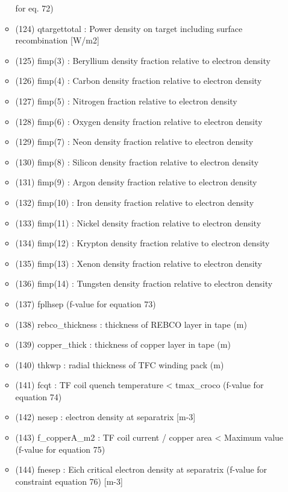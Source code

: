 \documentclass[]{article}
\begin{document}
\begin{itemize}
\begin{itemize}
    for eq. 72)
  \item
    (124) qtargettotal : Power density on target including surface
    recombination {[}W/m2{]}
  \item
    (125) fimp(3) : Beryllium density fraction relative to electron
    density
  \item
    (126) fimp(4) : Carbon density fraction relative to electron density
  \item
    (127) fimp(5) : Nitrogen fraction relative to electron density
  \item
    (128) fimp(6) : Oxygen density fraction relative to electron density
  \item
    (129) fimp(7) : Neon density fraction relative to electron density
  \item
    (130) fimp(8) : Silicon density fraction relative to electron
    density
  \item
    (131) fimp(9) : Argon density fraction relative to electron density
  \item
    (132) fimp(10) : Iron density fraction relative to electron density
  \item
    (133) fimp(11) : Nickel density fraction relative to electron
    density
  \item
    (134) fimp(12) : Krypton density fraction relative to electron
    density
  \item
    (135) fimp(13) : Xenon density fraction relative to electron density
  \item
    (136) fimp(14) : Tungsten density fraction relative to electron
    density
  \item
    (137) fplhsep (f-value for equation 73)
  \item
    (138) rebco\_thickness : thickness of REBCO layer in tape (m)
  \item
    (139) copper\_thick : thickness of copper layer in tape (m)
  \item
    (140) thkwp : radial thickness of TFC winding pack (m)
  \item
    (141) fcqt : TF coil quench temperature \textless{} tmax\_croco
    (f-value for equation 74)
  \item
    (142) nesep : electron density at separatrix {[}m-3{]}
  \item
    (143) f\_copperA\_m2 : TF coil current / copper area \textless{}
    Maximum value (f-value for equation 75)
  \item
    (144) fnesep : Eich critical electron density at separatrix (f-value
    for constraint equation 76) {[}m-3{]}

\end{itemize}
\end{itemize}
\end{document}

